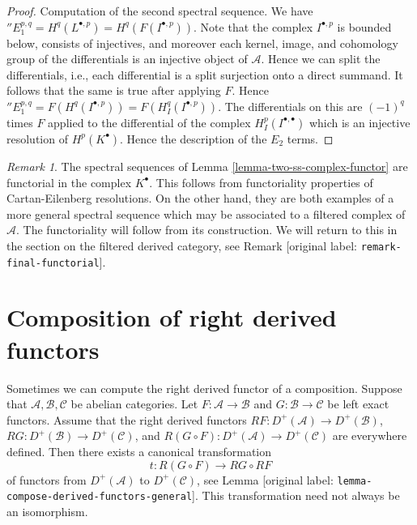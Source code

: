 \documentclass[10pt,a4paper]{article}
\theoremstyle{plain}
\theoremstyle{definition}
\theoremstyle{remark}
\newtheorem{remark}[subsection]{Remark}
\numberwithin{equation}{subsection}
\begin{document}
\begin{proof}
\medskip\noindent
Computation of the second spectral sequence. We have
${}''E_1^{p, q} = H^q(L^{\bullet, p}) = H^q(F(I^{\bullet, p}))$.
Note that the complex $I^{\bullet, p}$ is bounded below,
consists of injectives, and moreover each kernel, image, and
cohomology group of the differentials is an injective object
of $\mathcal{A}$. Hence we can split the differentials, i.e.,
each differential is a split surjection onto a direct summand.
It follows that the same is true after applying $F$. Hence
${}''E_1^{p, q} = F(H^q(I^{\bullet, p})) = F(H^q_I(I^{\bullet, p}))$.
The differentials on this are $(-1)^q$ times $F$ applied to
the differential of the complex $H^p_I(I^{\bullet, \bullet})$
which is an injective resolution of $H^p(K^\bullet)$. Hence the
description of the $E_2$ terms.
\end{proof}

\begin{remark}
\label{remark-functorial-ss}
The spectral sequences of Lemma \ref{lemma-two-ss-complex-functor}
are functorial in the complex $K^\bullet$. This follows from functoriality
properties of Cartan-Eilenberg resolutions. On the other hand, they are
both examples of a more general spectral sequence which may be associated
to a filtered complex of $\mathcal{A}$. The functoriality will follow from
its construction. We will return to this in the section on the filtered
derived category, see Remark [original label: \nolinkurl{remark-final-functorial}].
\end{remark}










\section{Composition of right derived functors}

\label{section-composition-right-derived-functors}

\noindent
Sometimes we can compute the right derived functor of a composition.
Suppose that $\mathcal{A}, \mathcal{B}, \mathcal{C}$ be abelian categories.
Let $F : \mathcal{A} \to \mathcal{B}$ and $G : \mathcal{B} \to \mathcal{C}$
be left exact functors. Assume that the right derived functors
$RF : D^{+}(\mathcal{A}) \to D^{+}(\mathcal{B})$,
$RG : D^{+}(\mathcal{B}) \to D^{+}(\mathcal{C})$, and
$R(G \circ F) : D^{+}(\mathcal{A}) \to D^{+}(\mathcal{C})$
are everywhere defined. Then there exists a canonical transformation
$$
t : R(G \circ F) \longrightarrow RG \circ RF
$$
of functors from $D^{+}(\mathcal{A})$ to $D^{+}(\mathcal{C})$, see
Lemma [original label: \nolinkurl{lemma-compose-derived-functors-general}].
This transformation need not always be an isomorphism.
\end{document}
